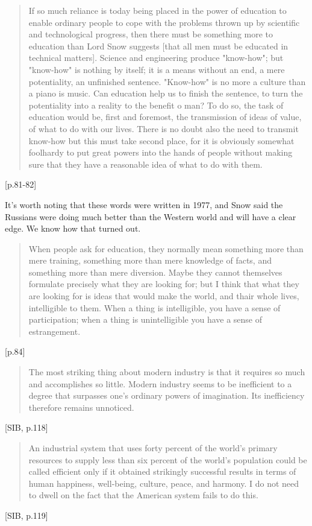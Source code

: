 \begin{quote}
If so much reliance is today being placed in the power of education to enable ordinary people to cope with the problems thrown up by scientific and technological progress, then there must be something more to education than Lord Snow suggests [that all men must be educated in technical matters]. Science and engineering produce "know-how"; but "know-how" is nothing by itself; it is a means without an end, a mere potentiality, an unfinished sentence. "Know-how" is no more a culture than a piano is music. Can education help us to finish the sentence, to turn the potentiality into a reality to the benefit o man? To do so, the task of education would be, first and foremost, the transmission of ideas of value, of what to do with our lives. There is no doubt also the need to transmit know-how but this must take second place, for it is obviously somewhat foolhardy to put great powers into the hands of people without making sure that they have a reasonable idea of what to do with them.
\end{quote}[p.81-82]

It's worth noting that these words were written in 1977, and Snow said the Russians were doing much better than the Western world and will have a clear edge. We know how that turned out.

\begin{quote}
When people ask for education, they normally mean something more than mere training, something more than mere knowledge of facts, and something more than mere diversion. Maybe they cannot themselves formulate precisely what they are looking for; but I think that what they are looking for is ideas that would make the world, and thair whole lives, intelligible to them. When a thing is intelligible, you have a sense of participation; when a thing is unintelligible you have a sense of estrangement.
\end{quote}[p.84]

\begin{quote}
  The most striking thing about modern industry is that it requires so much and accomplishes so little. Modern industry seems to be inefficient to a degree that surpasses one's ordinary powers of imagination. Its inefficiency therefore remains unnoticed.
\end{quote} [SIB, p.118]

\begin{quote}
  An industrial system that uses forty percent of the world's primary resources to supply less than six percent of the world's population could be called efficient only if it obtained strikingly successful results in terms of human happiness, well-being, culture, peace, and harmony. I do not need to dwell on the fact that the American system fails to do this.
\end{quote}[SIB, p.119]

